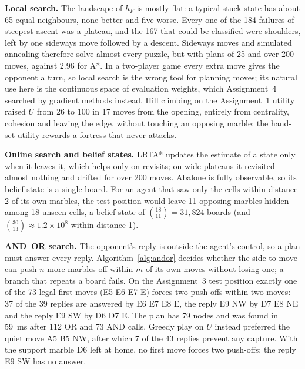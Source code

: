 \documentclass[a4paper,10pt]{article}
\begin{document}
\textbf{Local search.} The landscape of $h_F$ is mostly flat: a typical stuck state has about 65 equal neighbours,
none better and five worse. Every one of the 184 failures of steepest ascent was a plateau, and the 167 that could
be classified were shoulders, left by one sideways move followed by a descent. Sideways moves and simulated annealing
therefore solve almost every puzzle, but with plans of 25 and over 200 moves, against 2.96 for A*. In a two-player
game every extra move gives the opponent a turn, so local search is the wrong tool for planning moves; its natural
use here is the continuous space of evaluation weights, which Assignment~4 searched by gradient methods instead.
Hill climbing on the Assignment~1 utility raised $U$ from 26 to 100 in 17 moves from the opening, entirely from
centrality, cohesion and leaving the edge, without touching an opposing marble: the hand-set utility rewards a
fortress that never attacks.

\textbf{Online search and belief states.} LRTA* updates the estimate of a state only when it leaves it, which helps
only on revisits; on wide plateaus it revisited almost nothing and drifted for over 200 moves. Abalone is fully
observable, so its belief state is a single board. For an agent that saw only the cells within distance 2 of its
own marbles, the test position would leave 11 opposing marbles hidden among 18 unseen cells, a belief state of
$\binom{18}{11}=31{,}824$ boards (and $\binom{30}{13}\approx1.2\times10^8$ within distance 1).

\textbf{AND--OR search.} The opponent's reply is outside the agent's control, so a plan must answer every reply.
Algorithm~\ref{alg:andor} decides whether the side to move can push $n$ more marbles off within $m$ of its own moves
without losing one; a branch that repeats a board fails. On the Assignment~3 test position exactly one of the 73
legal first moves (E5 E6 E7 E) forces two push-offs within two moves: 37 of the 39 replies are answered by
E6 E7 E8 E, the reply E9 NW by D7 E8 NE and the reply E9 SW by D6 D7 E. The plan has 79 nodes and was found in 59~ms
after 112 OR and 73 AND calls. Greedy play on $U$ instead preferred the quiet move A5 B5 NW, after which 7 of the 43
replies prevent any capture. With the support marble D6 left at home, no first move forces two push-offs: the reply
E9 SW has no answer.
\end{document}
